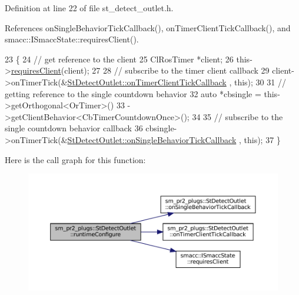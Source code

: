 Definition at line 22 of file st\+\_\+detect\+\_\+outlet.\+h.



References on\+Single\+Behavior\+Tick\+Callback(), on\+Timer\+Client\+Tick\+Callback(), and smacc\+::\+I\+Smacc\+State\+::requires\+Client().


\begin{DoxyCode}
23     \{
24         \textcolor{comment}{// get reference to the client}
25         ClRosTimer *client;
26         this->\hyperlink{classsmacc_1_1ISmaccState_a7f95c9f0a6ea2d6f18d1aec0519de4ac}{requiresClient}(client);
27 
28         \textcolor{comment}{// subscribe to the timer client callback}
29         client->onTimerTick(&\hyperlink{structsm__pr2__plugs_1_1StDetectOutlet_a7d94748f071c0ee4b8055018ec546978}{StDetectOutlet::onTimerClientTickCallback}
      , \textcolor{keyword}{this});
30 
31         \textcolor{comment}{// getting reference to the single countdown behavior}
32         \textcolor{keyword}{auto} *cbsingle = this->getOrthogonal<OrTimer>()
33                              ->getClientBehavior<CbTimerCountdownOnce>();
34 
35         \textcolor{comment}{// subscribe to the single countdown behavior callback}
36         cbsingle->onTimerTick(&\hyperlink{structsm__pr2__plugs_1_1StDetectOutlet_a866f3243790c115b886d447725fa602b}{StDetectOutlet::onSingleBehaviorTickCallback}
      , \textcolor{keyword}{this});
37     \}
\end{DoxyCode}
Here is the call graph for this function\+:
\nopagebreak
\begin{figure}[H]
\begin{center}
\leavevmode
\includegraphics[width=350pt]{structsm__pr2__plugs_1_1StDetectOutlet_a9fbc44b452367aa843d37316eb6e64bc_cgraph}
\end{center}
\end{figure}
\mbox{\label{structsm__pr2__plugs_1_1StDetectOutlet_afec8c7c7af071a426208a1a23f26a2bb}} 
